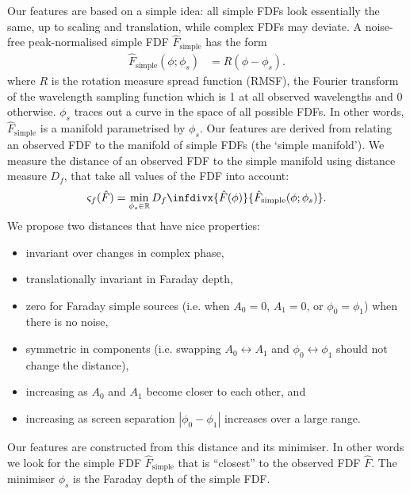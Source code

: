     Our features are based on a simple idea: all simple FDFs look essentially the same, up to scaling and translation, while complex FDFs may deviate. A noise-free peak-normalised simple FDF $\hat F_{\mathrm{simple}}$ has the form
    \begin{align}
        \label{eq:faraday-f-simple}
        \hat F_{\mathrm{simple}}(\phi; \phi_s) &= R(\phi - \phi_s).
    \end{align}
    where $R$ is the rotation measure spread function (RMSF), the Fourier transform of the wavelength sampling function which is 1 at all observed wavelengths and 0 otherwise. $\phi_s$ traces out a curve in the space of all possible FDFs. In other words, $\hat F_{\mathrm{simple}}$ is a manifold parametrised by $\phi_s$. Our features are derived from relating an observed FDF to the manifold of simple FDFs (the `simple manifold'). We measure the distance of an observed FDF to the simple manifold using distance measure $D_f$, that take all values of the FDF into account:
    \begin{equation}
        \label{eq:faraday-complexity-model}
        \varsigma_f(\hat F) = \min_{\phi_s \in \mathbb{R}} D_f\infdivx{\hat F(\phi)}{\hat F_{\mathrm{simple}}(\phi; \phi_s)}.
    \end{equation}
    We propose two distances that have nice properties:
    \begin{itemize}
        \item invariant over changes in complex phase,
        \item translationally invariant in Faraday depth,
        \item zero for Faraday simple sources (i.e. when $A_0 = 0$, $A_1 = 0$, or $\phi_0 = \phi_1$) when there is no noise,
        \item symmetric in components (i.e. swapping $A_0 \leftrightarrow A_1$ and $\phi_0 \leftrightarrow \phi_1$ should not change the distance),
        \item increasing as $A_0$ and $A_1$ become closer to each other, and
        \item increasing as screen separation $|\phi_0 - \phi_1|$ increases over a large range.
    \end{itemize}
    Our features are constructed from this distance and its minimiser. In other words
    we look for the simple FDF $\hat{F}_{\mathrm{simple}}$ that is ``closest'' to the observed FDF $\hat{F}$.
    The minimiser $\phi_s$ is the Faraday depth of the simple FDF.

